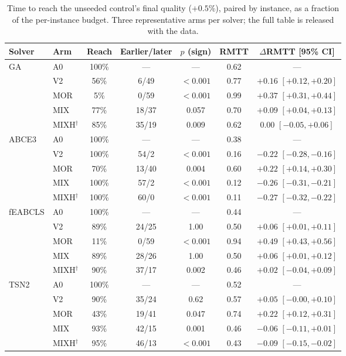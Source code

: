 \documentclass[review]{elsarticle}
\begin{document}
\begin{table}[htbp]
\centering
\caption{Time to reach the unseeded control's final quality ($+0.5\%$),
paired by instance, as a fraction of the per-instance budget. Three
representative arms per solver; the full table is released with the data.}
\label{tab:ttt}
\small
\begin{tabular}{llccccc}
\toprule
Solver & Arm & Reach & Earlier/later & $p$ (sign) & RMTT & $\Delta$RMTT [95\% CI] \\
\midrule
\multirow{5}{*}{GA}
 & A0  & 100\% & ---   & ---      & 0.62 & --- \\
 & V2  & 56\%  & 6/49  & $<0.001$ & 0.77 & $+0.16$ $[+0.12,+0.20]$ \\
 & MOR & 5\%   & 0/59  & $<0.001$ & 0.99 & $+0.37$ $[+0.31,+0.44]$ \\
 & MIX & 77\%  & 18/37 & 0.057    & 0.70 & $+0.09$ $[+0.04,+0.13]$ \\
 & MIXH$^{\dagger}$ & 85\% & 35/19 & 0.009 & 0.62 & $0.00$ $[-0.05,+0.06]$ \\
\midrule
\multirow{5}{*}{ABCE3}
 & A0  & 100\% & ---   & ---      & 0.38 & --- \\
 & V2  & 100\% & 54/2  & $<0.001$ & 0.16 & $-0.22$ $[-0.28,-0.16]$ \\
 & MOR & 70\%  & 13/40 & 0.004    & 0.60 & $+0.22$ $[+0.14,+0.30]$ \\
 & MIX & 100\% & 57/2  & $<0.001$ & 0.12 & $-0.26$ $[-0.31,-0.21]$ \\
 & MIXH$^{\dagger}$ & 100\% & 60/0 & $<0.001$ & 0.11 & $-0.27$ $[-0.32,-0.22]$ \\
\midrule
\multirow{5}{*}{fEABCLS}
 & A0  & 100\% & ---   & ---      & 0.44 & --- \\
 & V2  & 89\%  & 24/25 & 1.00     & 0.50 & $+0.06$ $[+0.01,+0.11]$ \\
 & MOR & 11\%  & 0/59  & $<0.001$ & 0.94 & $+0.49$ $[+0.43,+0.56]$ \\
 & MIX & 89\%  & 28/26 & 1.00     & 0.50 & $+0.06$ $[+0.01,+0.12]$ \\
 & MIXH$^{\dagger}$ & 90\% & 37/17 & 0.002 & 0.46 & $+0.02$ $[-0.04,+0.09]$ \\
\midrule
\multirow{5}{*}{TSN2}
 & A0  & 100\% & ---   & ---      & 0.52 & --- \\
 & V2  & 90\%  & 35/24 & 0.62     & 0.57 & $+0.05$ $[-0.00,+0.10]$ \\
 & MOR & 43\%  & 19/41 & 0.047    & 0.74 & $+0.22$ $[+0.12,+0.31]$ \\
 & MIX & 93\%  & 42/15 & 0.001    & 0.46 & $-0.06$ $[-0.11,+0.01]$ \\
 & MIXH$^{\dagger}$ & 95\% & 46/13 & $<0.001$ & 0.43 & $\mathbf{-0.09}$ $[-0.15,-0.02]$ \\
\bottomrule
\end{tabular}
\end{table}
\end{document}
